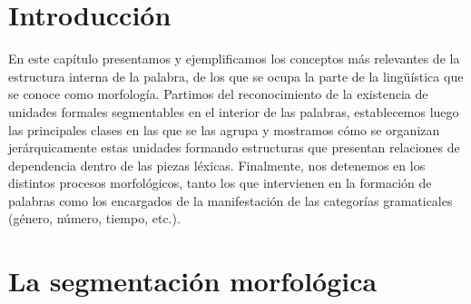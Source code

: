 
\section{Introducción}

En este capítulo presentamos y ejemplificamos los conceptos más relevantes de la
estructura interna de la palabra, de los que se ocupa la parte de la
lingüística que se conoce como morfología. Partimos del reconocimiento de la
existencia de unidades formales segmentables en el interior de las palabras,
establecemos luego las principales clases en las que se las agrupa y mostramos
cómo se organizan jerárquicamente estas unidades formando estructuras que
presentan relaciones de dependencia dentro de las piezas léxicas. Finalmente,
nos detenemos en los distintos procesos morfológicos, tanto los que intervienen
en la formación de palabras como los encargados de la manifestación de las
categorías gramaticales (género, número, tiempo, etc.).

\section{La segmentación morfológica}\label{sec:04-segmentacion}

